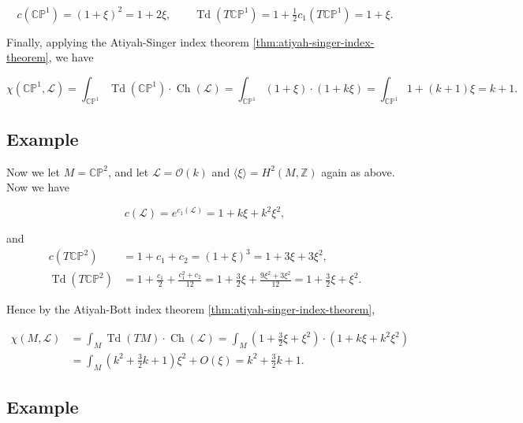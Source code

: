 \documentclass[11pt]{amsart}
\newcommand{\lbracket}{\left(}
\newcommand{\rbracket}{\right)}
\newcommand{\PP}{\mathbb{P}}
\newcommand{\CC}{\mathbb{C}}
\newcommand{\ZZ}{\mathbb{Z}}
\newcommand{\mcL}{\mathcal{L}}
\newcommand{\mcO}{\mathcal{O}}
\DeclareMathOperator{\Td}{Td}
\DeclareMathOperator{\Ch}{Ch}
\begin{document}
\begin{equation*}
	c(\CC\PP^{1}) = (1 + \xi)^{2} = 1 + 2\xi, \qquad \Td(T\CC\PP^{1}) = 1 + \tfrac{1}{2}c_{1}(T\CC\PP^{1}) = 1 + \xi.
\end{equation*}

Finally, applying the Atiyah-Singer index theorem \ref{thm:atiyah-singer-index-theorem}, we have

\begin{equation*}
	\chi(\CC\PP^{1}, \mcL) = \int_{\CC\PP^{1}} \Td(\CC\PP^{1}) \cdot \Ch(\mcL) = \int_{\CC\PP^{1}} (1 + \xi) \cdot (1 + k\xi ) = \int_{\CC\PP^{1}} 1 + (k+1)\xi = k + 1.
\end{equation*}

\subsection*{Example}

Now we let $M = \CC\PP^{2}$, and let $\mcL = \mcO(k)$ and $\langle \xi \rangle = H^{2}(M, \ZZ)$ again as above. Now we have

\begin{equation*}
	c(\mcL) = e^{c_{1}(\mcL)} = 1 + k\xi + k^{2}\xi^{2},
\end{equation*}

and 
\begin{equation*}
	\begin{split}
		c(T\CC\PP^{2}) &= 1 + c_{1} + c_{2} = (1 + \xi)^{3} = 1 + 3\xi + 3\xi^{2}, \\ 
		\Td(T\CC\PP^{2}) &= 1 + \frac{c_{1}}{2} + \frac{c_{1}^{2} + c_{2}}{12} = 1 + \frac{3}{2}\xi + \frac{9\xi^{2} + 3\xi^{2}}{12} = 1 + \frac{3}{2}\xi + \xi^{2}.
	\end{split}
\end{equation*}

Hence by the Atiyah-Bott index theorem \ref{thm:atiyah-singer-index-theorem},

\begin{equation*}
	\begin{split}
		\chi(M, \mcL) &= \int_{M} \Td(TM) \cdot \Ch(\mcL) = \int_{M} \lbracket 1 + \tfrac{3}{2}\xi + \xi^{2} \rbracket \cdot \lbracket 1 + k\xi + k^{2}\xi^{2} \rbracket \\
		&= \int_{M} (k^{2} + \tfrac{3}{2}k + 1)\xi^{2} + O(\xi) = k^{2} + \tfrac{3}{2}k + 1.
	\end{split}
\end{equation*}

\subsection*{Example}
\end{document}
